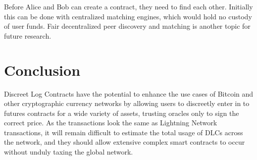 \documentclass[11pt]{article}
\begin{document}
Before Alice and Bob can create a contract, they need to find each other.  Initially this can be done with centralized matching engines, which would hold no custody of user funds.  Fair decentralized peer discovery and matching is another topic for future research.

\section*{Conclusion}

Discreet Log Contracts have the potential to enhance the use cases of Bitcoin and other cryptographic currency networks by allowing users to discreetly enter in to futures contracts for a wide variety of assets, trusting oracles only to sign the correct price.  As the transactions look the same as Lightning Network transactions, it will remain difficult to estimate the total usage of DLCs across the network, and they should allow extensive complex smart contracts to occur without unduly taxing the global network.




\end{document}
